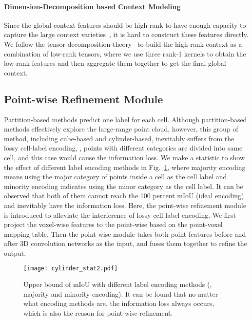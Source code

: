\documentclass[final]{cvpr}
\begin{document}
    

\paragraph{Dimension-Decomposition based Context Modeling}
Since the global context features should be high-rank to have enough capacity to capture the large context varieties~\cite{zhang2019co}, it is hard to construct these features directly. We follow the tensor decomposition theory~\cite{chen2020tensor} to build the high-rank context as a combination of low-rank tensors, where we use three rank-1 kernels to obtain the low-rank features and then aggregate them together to get the final global context.



\subsection{Point-wise Refinement Module}



Partition-based methods predict one label for each cell. Although partition-based methods effectively explore the large-range point cloud, however, this group of method, including cube-based and cylinder-based, inevitably suffers from the lossy cell-label encoding, \eg, points with different categories are divided into same cell, and this case would cause the information loss. We make a statistic to show the effect of different label encoding methods in Fig.~\ref{fig:stat2}, where majority encoding means using the major category of points inside a cell as the cell label and minority encoding indicates using the minor category as the cell label. It can be observed that both of them cannot reach the 100 percent mIoU (ideal encoding) and inevitably have the information loss. Here, the point-wise refinement module is introduced to alleviate the interference of lossy cell-label encoding. We first project the voxel-wise features to the point-wise based on the point-voxel mapping table. Then the point-wise module takes both point features before and after 3D convolution networks as the input, and fuses them together to refine the output.

\begin{figure}[t]
    \centering
    \texttt{[image: cylinder\_stat2.pdf]}
    \caption{Upper bound of mIoU with different label encoding methods (\ie, majority and minority encoding). It can be found that no matter what encoding methods are, the information loss always occurs, which is also the reason for point-wise refinement. }
    \label{fig:stat2}
\end{figure}
\end{document}
